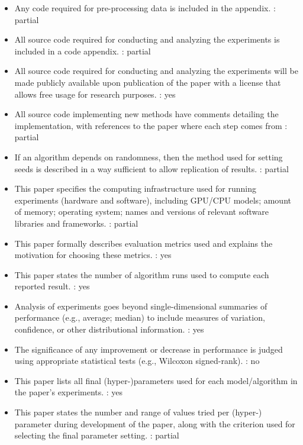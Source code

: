 \begin{itemize}
\item Any code required for pre-processing data is included in the appendix. : partial %
\item All source code required for conducting and analyzing the experiments is included in a code appendix. : partial %
\item All source code required for conducting and analyzing the experiments will be made publicly available upon publication of the paper with a license that allows free usage for research purposes. : yes %
\item All source code implementing new methods have comments detailing the implementation, with references to the paper where each step comes from : partial %
\item If an algorithm depends on randomness, then the method used for setting seeds is described in a way sufficient to allow replication of results. : partial %
\item This paper specifies the computing infrastructure used for running experiments (hardware and software), including GPU/CPU models; amount of memory; operating system; names and versions of relevant software libraries and frameworks. : partial %
\item This paper formally describes evaluation metrics used and explains the motivation for choosing these metrics. : yes %
\item This paper states the number of algorithm runs used to compute each reported result. : yes %
\item Analysis of experiments goes beyond single-dimensional summaries of performance (e.g., average; median) to include measures of variation, confidence, or other distributional information. : yes %
\item The significance of any improvement or decrease in performance is judged using appropriate statistical tests (e.g., Wilcoxon signed-rank). : no %
\item This paper lists all final (hyper-)parameters used for each model/algorithm in the paper’s experiments. : yes %
\item This paper states the number and range of values tried per (hyper-) parameter during development of the paper, along with the criterion used for selecting the final parameter setting. : partial %
\end{itemize}

